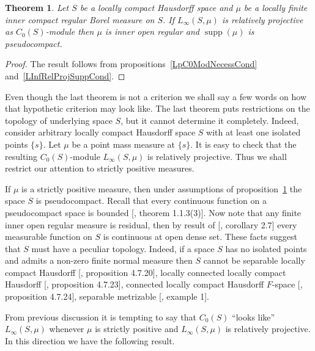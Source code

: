 \documentclass[12pt]{article}
\newtheorem{theorem}{Theorem}[section]
\begin{document}
\begin{theorem}\label{LInfReProjNecessCond} Let $S$ be a locally compact
    Hausdorff space and $\mu$ be a locally finite inner compact regular Borel
    measure on $S$. If $L_\infty(S,\mu)$ is relatively projective as
    $C_0(S)$-module then $\mu$ is inner open regular and
    $\operatorname{supp}(\mu)$ is pseudocompact.

\end{theorem}
\begin{proof} The result follows from propositions~\ref{LpC0ModNecessCond}
    and~\ref{LInfRelProjSuppCond}.
\end{proof}

Even though the last theorem is not a criterion we shall say a few words on how
that hypothetic criterion may look like. The last theorem puts restrictions on
the topology of underlying space $S$, but it cannot determine it completely.
Indeed, consider arbitrary locally compact Hausdorff space $S$ with at least one
isolated points $\{s\}$. Let $\mu$ be a point mass measure at $\{s\}$. It is
easy to check that the resulting $C_0(S)$-module $L_\infty(S,\mu)$ is relatively
projective. Thus we shall restrict our attention to strictly positive measures.

If $\mu$ is a strictly positive measure, then under assumptions of
proposition~\ref{LInfReProjNecessCond} the space $S$ is pseudocompact. Recall
that every continuous function on a pseudocompact space is bounded
    [\cite{HrusPseudCompTopSp}, theorem 1.1.3(3)]. Now note that any finite inner
open regular measure is residual, then by result of
    [\cite{ZindResMeasLocCompSp}, corollary 2.7] every measurable function on $S$ is
continuous at open dense set. These facts suggest that $S$ must have a peculiar
topology. Indeed, if a space $S$ has no isolated points and admits a non-zero
finite normal measure then $S$ cannot be separable locally compact Hausdorff
    [\cite{DalesBanSpContFunDualSp}, proposition 4.7.20], locally connected locally
compact Hausdorff [\cite{DalesBanSpContFunDualSp}, proposition 4.7.23],
connected locally compact Hausdorff $F$-space [\cite{DalesBanSpContFunDualSp},
proposition 4.7.24], separable metrizable [\cite{FlachNormMeasTopSp}, example
        1].

From previous discussion it is tempting to say that $C_0(S)$ ``looks like''
$L_\infty(S,\mu)$ whenever $\mu$ is strictly positive and $L_\infty(S,\mu)$ is
relatively projective. In this direction we have the following result.
\end{document}
